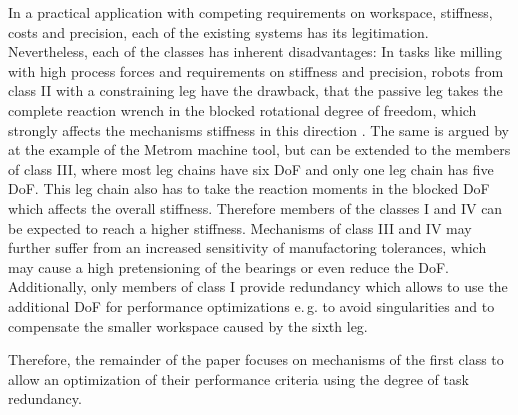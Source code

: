 \documentclass[robotics,article,submit,moreauthors,pdftex]{Definitions/mdpi}
\begin{document}
In a practical application with competing requirements on workspace, stiffness, costs and precision, each of the existing systems has its legitimation.
Nevertheless, each of the classes has inherent disadvantages:
In tasks like milling with high process forces and requirements on stiffness and precision, robots from class II with a constraining leg have the drawback, that the passive leg takes the complete reaction wrench in the blocked rotational degree of freedom, which strongly affects the mechanisms stiffness in this direction \cite{ZhangGos2001}.
The same is argued by \cite{LinLiYanZha2013} at the example of the Metrom machine tool, but can be extended to the members of class III, where most leg chains have six DoF and only one leg chain has five DoF.
This leg chain also has to take the reaction moments in the blocked DoF which affects the overall stiffness.
Therefore members of the classes I and IV can be expected to reach a higher stiffness.
Mechanisms of class III and IV may further suffer from an increased sensitivity of manufactoring tolerances, which may cause a high pretensioning of the bearings or even reduce the DoF.
Additionally, only members of class I provide redundancy which allows to use the additional DoF for performance optimizations e.\,g. to avoid singularities and to compensate the smaller workspace caused by the sixth leg.

Therefore, the remainder of the paper focuses on mechanisms of the first class to allow an optimization of their performance criteria using the degree of task redundancy.

\end{document}
